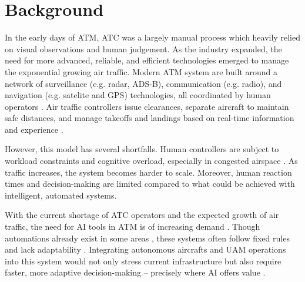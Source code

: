 \section{Background}


In the early days of \gls{ATM}, \gls{ATC} was a largely manual process which heavily relied on visual observations and human judgement. 
As the industry expanded, the need for more advanced, reliable, and efficient technologies emerged to manage the exponential growing air traffic.
Modern \gls{ATM} system are built around a network of surveillance (e.g. radar, \gls{ADS-B}),  communication (e.g. radio), and navigation (e.g. satelite and \gls{GPS}) technologies, all coordinated by human operators \cite{careerroo2024technology}.  
Air traffic controllers issue clearances, separate aircraft to maintain safe distances, and manage takeoffs and landings based on real-time information and experience \cite{dfs2025controller}.

However, this model has several shortfalls. 
Human controllers are subject to workload constraints and cognitive overload, especially in congested airspace \cite{Meier_2024}.
As traffic increases, the system becomes harder to scale. 
Moreover, human reaction times and decision-making are limited compared to what could be achieved with intelligent, automated systems.

With the current shortage of \gls{ATC} operators and the expected growth of air traffic, the need for \gls{AI} tools in \gls{ATM} is of increasing demand \cite{Meier_2024}.
Though automations already exist in some areas \cite{skybrary2025automation}, these systems often follow fixed rules and lack adaptability \cite{Meier_2024}. 
Integrating autonomous aircrafts and \gls{UAM} operations into this system would not only stress current infrastructure but also require faster, more adaptive decision-making \cite{Rumba_2020} -- precisely where AI offers value .

